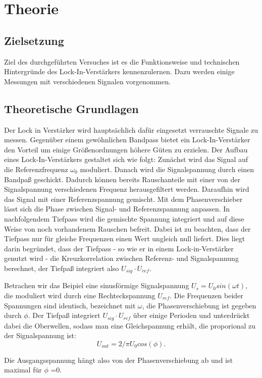 \section{Theorie}
\label{sec:Theorie}
\subsection{Zielsetzung}
\label{sec:Zielsetzung}
Ziel des durchgeführten Versuches ist es die Funktionsweise und technischen
Hintergründe des Lock-In-Verstärkers kennenzulernen. Dazu werden einige
Messungen mit verschiedenen Signalen vorgenommen.

\subsection{Theoretische Grundlagen}
\label{sec:Grundlagen}
Der Lock in Verstärker wird hauptsächlich dafür eingesetzt verrauschte Signale
zu messen. Gegenüber einem gewöhnlichen Bandpass bietet ein Lock-In-Verstärker
den Vorteil um einige Größenordnungen höhere Güten zu erzielen.
Der Aufbau eines Lock-In-Verstärkers gestaltet sich wie folgt:
Zunächst wird das Signal auf die Referenzfrequenz $\omega_0$ moduliert.
Danach wird die Signalspannung durch einen Bandpaß geschickt. Dadurch
können bereits Rauschanteile mit einer von der Signalspannung verschiedenen
Frequenz herausgefiltert werden.
Daraufhin wird das Signal mit einer Referenzspannung gemischt. Mit dem
Phasenverschieber lässt sich die Phase zwischen Signal- und Referenzspannung
anpassen.
In nachfolgendem Tiefpass wird die gemischte Spannung integriert und auf diese
Weise von noch vorhandenem Rauschen befreit. Dabei ist zu beachten, dass der
Tiefpass nur für gleiche Frequenzen einen Wert ungleich null liefert. Dies liegt
darin begründet, dass der Tiefpass - so wie er in einem Lock-in-Verstärker
genutzt wird - die Kreuzkorrelation zwischen Referenz- und Signalspannung
berechnet, der Tiefpaß integriert also $U_{sig} \cdot U_{ref}$.

Betrachen wir das Beipiel eine sinusförmige Signalspannung $U_s = U_0 sin(\omega
t)$, die moduliert wird durch eine Rechteckspannung $U_{ref}$. Die Frequenzen
beider Spannungen sind identisch, bezeichnet mit $\omega$,
die Phasenverschiebung ist gegeben durch $\phi$.
Der Tiefpaß integriert $U_{sig} \cdot U_{ref}$ über einige Perioden und
unterdrückt dabei die Oberwellen, sodass man eine Gleichspannung erhält, die
proporional zu der Signalspannung ist:
\begin{equation}
U_{out} = 2/\pi U_0cos(\phi).
\label{eqn:Uout}
\end{equation}



Die Ausgangsspannung hängt also von der Phasenverschiebung ab und ist maximal
für $\phi$ =0.

\cite{sample}
